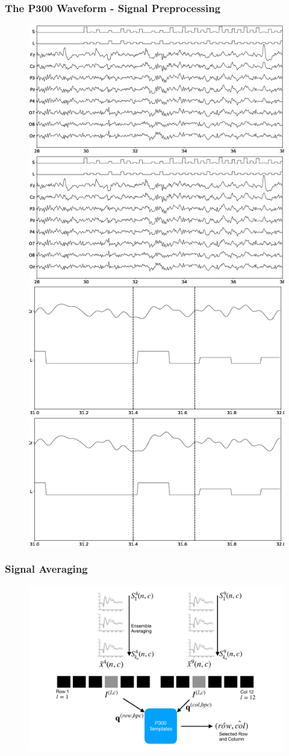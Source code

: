 \documentclass[aspectratio=169]{beamer}
\begin{document}
\begin{frame}
\frametitle{The P300 Waveform - Signal Preprocessing}
\begin{figure}[h!]
\centering
\includegraphics[width=.45\linewidth]{images/nogain.eps}
\includegraphics[width=.45\linewidth]{images/singlegain.eps}\\
\includegraphics[width=.45\linewidth]{images/nogainzoomhit.eps}
\includegraphics[width=.45\linewidth]{images/singlegainzoomhit.eps}
\label{fig:gains}
\end{figure}
\end{frame}



\begin{frame}
\frametitle{Signal Averaging}
\begin{center}
\begin{figure}[htb]
\centering
\includegraphics[scale=0.5]{images/classificationgraph.pdf}
\label{fig:classification}
\end{figure}
\end{center}
\end{frame}     
\end{document}
